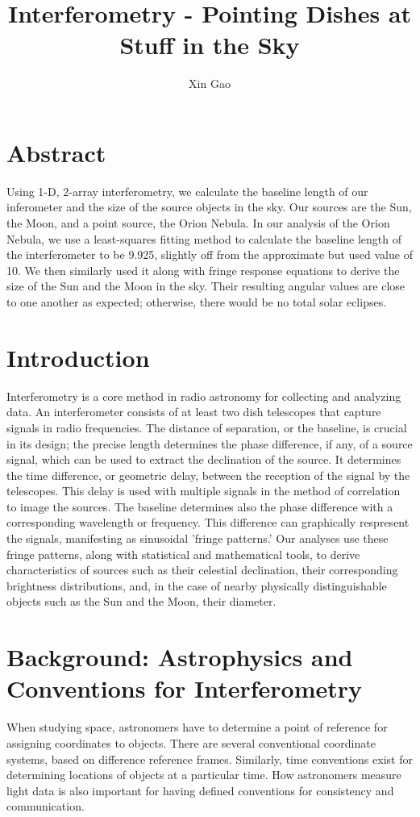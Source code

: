\documentclass{article}
\begin{document}
\title{Interferometry - Pointing Dishes at Stuff in the Sky}
\author{Xin Gao}
\date{}
\maketitle

\section{Abstract}
Using 1-D, 2-array interferometry, we calculate the baseline length of
our inferometer and the size of the source objects in the sky. Our
sources are the Sun, the Moon, and a point source, the Orion Nebula. In
our analysis of the Orion Nebula, we use a least-squares fitting method
to calculate the baseline length of the interferometer to be 9.925,
slightly off from the approximate but used value of 10. We then
similarly used it along with fringe response equations to derive the
size of the Sun and the Moon in the sky. Their resulting angular values
are close to one another as expected; otherwise, there would be no total
solar eclipses. 
\section{Introduction} 
Interferometry is a core method in radio astronomy for collecting and
analyzing data. An interferometer consists of at least two dish telescopes
that capture signals in radio frequencies. The distance of separation,
or the baseline, is crucial in its design; the precise length determines
the phase difference, if any, of a source signal, which can be used to
extract the declination of the source. It determines the time difference,
or geometric delay, between the reception of the signal by the
telescopes. This delay is used with multiple signals in the method of 
correlation to image the sources. The baseline determines also the phase
difference with a  corresponding wavelength or frequency. This
difference can graphically respresent the signals, manifesting as
sinusoidal 'fringe patterns.' Our analyses use these fringe patterns,
along with statistical and mathematical tools, to derive characteristics
of sources such as their celestial declination, their corresponding
brightness distributions, and, in the case of nearby physically
distinguishable objects such as the Sun and the Moon, their diameter. 

\section{Background: Astrophysics and Conventions for Interferometry}
When studying space, astronomers have to determine a point of reference
for assigning coordinates to objects. There are several conventional
coordinate systems, based on difference reference frames. Similarly,
time conventions exist for determining locations of objects at a
particular time. How astronomers measure light data is also important
for having defined conventions for consistency and communication.
\end{document}
